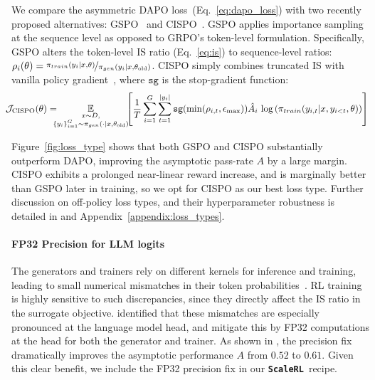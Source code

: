 \documentclass[]{fairmeta} %
\newcommand{\scalerl}{\texttt{\textbf{ScaleRL}}}
\begin{document}
We compare the asymmetric DAPO loss~(Eq.~\ref{eq:dapo_loss}) with two recently proposed alternatives: GSPO~\citep{gspo} and CISPO~\citep{minimax_m1, feng2025yourefficient}. GSPO applies importance sampling at the sequence level as opposed to GRPO’s token-level formulation. Specifically, GSPO alters the token-level IS ratio (Eq.~\ref{eq:is}) to sequence-level ratios: $ \rho_i(\theta) = \nicefrac{\pi_{train}(y_i|x, \theta)}{\pi_{gen}(y_i|x, \theta_{\text{old}})}$. CISPO simply combines truncated IS with vanilla policy gradient~\citep{ionides2008truncated}, where $\texttt{sg}$ is the stop-gradient function:
\begin{equation}
\hspace{-0.7em} \mathcal{J}_{\mathrm{CISPO}}(\theta) 
=\hspace{-0.7em} \underset{\substack{x \sim D, \\ \{y_i\}_{i=1}^G \sim \pi_{gen}(\cdot \mid x, \theta_{\text{old}})}}{\mathbb{E}}
\hspace{-0.4em}
\left[ \frac{1}{T} \sum_{i=1}^G \sum_{t=1}^{|y_i|} 
\texttt{sg}(\mathrm{min}(\rho_{i, t}, \epsilon_\text{max})) 
\hat{A}_i \, \log\left(\pi_{train}(y_{i,t}|x, y_{i<t},\theta)\right) \right]
\label{eq:cispo}
\end{equation} 


Figure~\ref{fig:loss_type} shows that both GSPO and CISPO substantially outperform DAPO, improving the asymptotic pass-rate $A$ by a large margin. CISPO exhibits a prolonged near-linear reward increase, and is marginally better than GSPO later in training, so we opt for CISPO as our best loss type. Further discussion on off-policy loss types, and their hyperparameter robustness is detailed in  and Appendix~\ref{appendix:loss_types}.



\paragraph{FP32 Precision for LLM logits}
\label{sec:fp32}

The generators and trainers rely on different kernels for inference and training, leading to small numerical mismatches in their token probabilities~\citep{he2025nondeterminism}. 
RL training is highly sensitive to such discrepancies, since they directly affect the IS ratio in the surrogate objective.
\citet{minimax_m1} identified that these mismatches are especially pronounced at the language model head, and mitigate this by FP32 computations at the head for both the generator and trainer. 
As shown in , the precision fix dramatically improves the asymptotic performance $A$ from $0.52$ to $0.61$. Given this clear benefit, we include the FP32 precision fix in our \scalerl\ recipe. 
\end{document}
